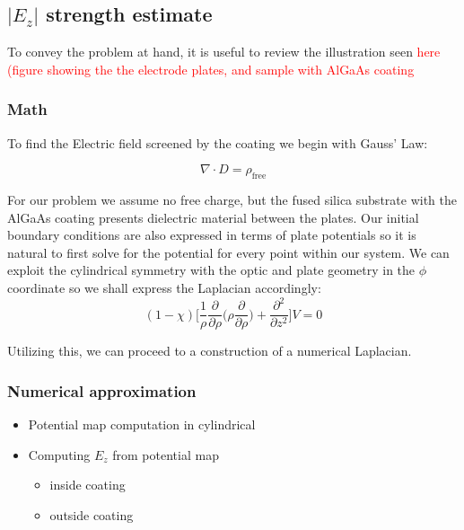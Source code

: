 \subsection{$|E_z|$ strength estimate}
To convey the problem at hand, it is useful to review the illustration seen \textcolor{red}{here (figure showing the the electrode plates, and sample with AlGaAs coating}
\subsubsection{Math}
To find the Electric field screened by the coating we begin with Gauss' Law:

\begin{equation}
\nabla \cdot D = \rho_\mathrm{free}
\end{equation}

For our problem we assume no free charge, but the fused silica substrate with the AlGaAs coating presents dielectric material between the plates. Our initial boundary conditions are also expressed in terms of plate potentials so it is natural to first solve for the potential for every point within our system. We can exploit the cylindrical symmetry with the optic and plate geometry in the $\phi$ coordinate so we shall express the Laplacian accordingly:
\begin{equation}
(1-\chi)\bigg[\frac{1}{\rho}\frac{\partial}{\partial \rho} \bigg( \rho \frac{\partial}{\partial \rho}\bigg) + \frac{\partial^2}{\partial z^2}\bigg]V = 0
\end{equation}

Utilizing this, we can proceed to a construction of a numerical Laplacian.

\subsubsection{Numerical approximation}


\begin{itemize}
\item Potential map computation in cylindrical
\item Computing $E_z$ from potential map
\begin{itemize}
\item inside coating
\item outside coating
\end{itemize}
\end{itemize}



